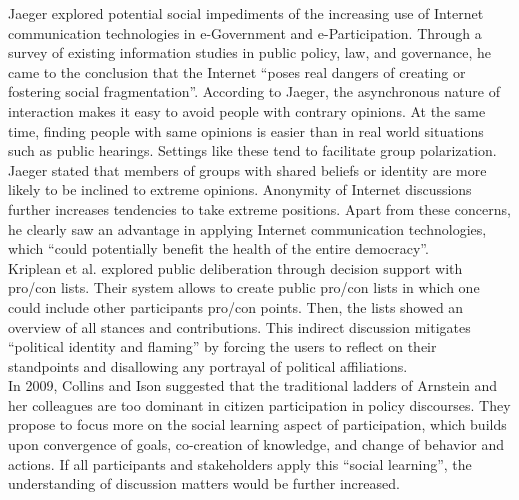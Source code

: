 Jaeger \cite{Jaeger2005_deliberate_democracy_and_egovernment} explored potential social impediments of the increasing use of Internet communication technologies in e-Government and e-Participation. Through a survey of existing information studies in public policy, law, and governance, he came to the conclusion that the Internet ``poses real dangers of creating or fostering social fragmentation''. According to Jaeger, the asynchronous nature of interaction makes it easy to avoid people with contrary opinions. At the same time, finding people with same opinions is easier than in real world situations such as public hearings. Settings like these tend to facilitate group polarization. Jaeger stated that members of groups with shared beliefs or identity are more likely to be inclined to extreme opinions. Anonymity of Internet discussions further increases tendencies to take extreme positions. Apart from these concerns, he clearly saw an advantage in applying Internet communication technologies, which ``could potentially benefit the health of the entire democracy''.\\
Kriplean et al. \cite{Kriplean2012_Considerit} explored public deliberation through decision support with pro/con lists. Their system allows to create public pro/con lists in which one could include other participants pro/con points. Then, the lists showed an overview of all stances and contributions. This indirect discussion mitigates ``political identity and flaming'' by forcing the users to reflect on their standpoints and disallowing any portrayal of political affiliations.\\
In 2009, Collins and Ison \cite{Collins2009_social_learning} suggested that the traditional ladders of Arnstein and her colleagues are too dominant in citizen participation in policy discourses. They propose to focus more on the social learning aspect of participation, which builds upon convergence of goals, co-creation of knowledge, and change of behavior and actions. If all participants and stakeholders apply this ``social learning'', the understanding of discussion matters would be further increased.%

